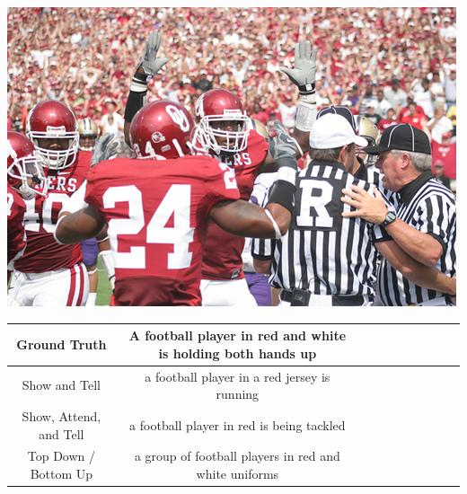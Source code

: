 \documentclass[a4paper]{article}
\begin{document}
\includegraphics[width=\textwidth]{241347204_007d83e252.jpg}
\\
\begin{center}
 \begin{tabular}{|c| c| c| c| c| c| c | c| c| c|} 
 \hline
 
 Ground Truth & A football player in red and white is holding both hands up\\ [0.2ex] 
 \hline
  Show and Tell & a football player in a red jersey is running\\ 
 \hline
	Show, Attend, and Tell & a football player in red is being tackled\\
 \hline
  Top Down / Bottom Up & a group of football players in red and white uniforms\\ 
 \hline
\end{tabular}
\end{center}
\end{document}
